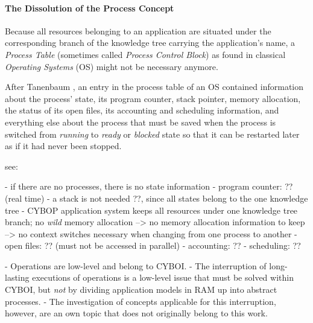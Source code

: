 %
%
%
%
%
%
%

\paragraph{The Dissolution of the Process Concept}
\label{dissolution_of_process_concept_heading}

Because all resources belonging to an application are situated under the
corresponding branch of the knowledge tree carrying the application's name, a
\emph{Process Table} (sometimes called \emph{Process Control Block}) as found
in classical \emph{Operating Systems} (OS) might not be necessary anymore.

After Tanenbaum \cite{tanenbaum2001}, an entry in the process table of an OS
contained information about the process' state, its program counter, stack
pointer, memory allocation, the status of its open files, its accounting and
scheduling information, and everything else about the process that must be
saved when the process is switched from \emph{running} to \emph{ready} or
\emph{blocked} state so that it can be restarted later as if it had never been
stopped.

see: \cite[p. 81]{tanenbaum2001}

- if there are no processes, there is no state information
- program counter: ?? (real time)
- a stack is not needed ??, since all states belong to the one knowledge tree
- CYBOP application system keeps all resources under one knowledge tree branch;
no \emph{wild} memory allocation --> no memory allocation information to keep
--> no context switches necessary when changing from one process to another
- open files: ?? (must not be accessed in parallel)
- accounting: ??
- scheduling: ??

- Operations are low-level and belong to CYBOI.
- The interruption of long-lasting executions of operations is a low-level issue
that must be solved within CYBOI, but \emph{not} by dividing application models
in RAM up into abstract processes.
- The investigation of concepts applicable for this interruption, however, are
an own topic that does not originally belong to this work.
